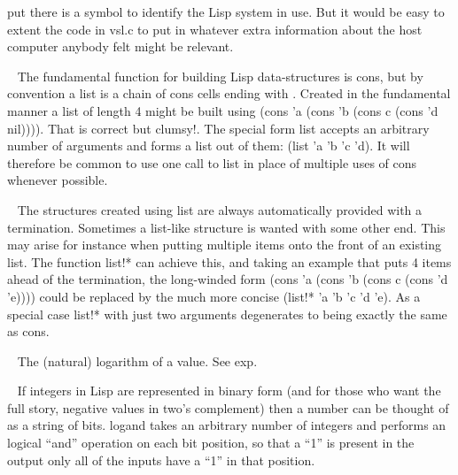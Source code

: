 \begin{description}
put there is a symbol \vsl{} to identify the Lisp system in use. But it would
be easy to extent the code in {\tx vsl.c} to put in whatever extra information
about the host computer anybody felt might be relevant.
\item[{\tx list~~~~~~~~~} \hspace{1cm} {\em special form}]~\newline
The fundamental function for building Lisp data-structures is {\tx cons},
but by convention a list is a chain of {\tx cons} cells ending with \nil.
Created in the fundamental manner a list of length 4 might be
built using {\tx (cons 'a (cons 'b (cons c (cons 'd nil))))}. That is correct
but clumsy!. The special form {\tx list} accepts an arbitrary number of
arguments and forms a list out of them: {\tx (list 'a 'b 'c 'd)}. It will
therefore be common to use one call to {\tx list} in place of
multiple uses of {\tx cons} whenever possible.
\item[{\tx list!*~~~~~~~} \hspace{1cm} {\em special form}]~\newline
The structures created using {\tx list} are always automatically provided
with a \nil{} termination. Sometimes a list-like structure is
wanted with some other end. This may arise for instance when putting
multiple items onto the front of an existing list. The function {\tx list!*}
can achieve this, and taking an example that puts 4 items ahead of the
termination, the long-winded form
{\tx (cons 'a (cons 'b (cons c (cons 'd 'e))))} could be replaced by the
much more concise {\tx (list!* 'a 'b 'c 'd 'e)}. As a special case
{\tx list!*} with just two arguments degenerates to being exactly the same
as {\tx cons}.
\item[{\tx log~~~~~~~~~~} \hspace{1cm} {\em special form}]~\newline
The (natural) logarithm of a value. See {\tx exp}.
\item[{\tx logand~~~~~~~} \hspace{1cm} {\em special form}]~\newline
If integers in Lisp are represented in binary form (and for those who want the
full story, negative values in two's complement) then a number can be thought
of as a string of bits. {\tx logand} takes an arbitrary number of integers
and performs an logical ``and'' operation on each bit position, so that a ``1''
is present in the output only all of the inputs have a ``1'' in that position.

\end{description}
